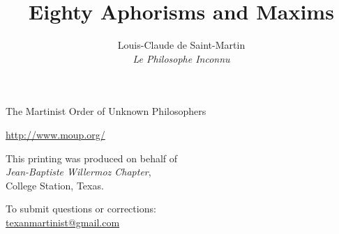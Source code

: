 \documentclass[openany,14pt]{article}
\title{Eighty Aphorisms and Maxims}
\author{Louis-Claude de Saint-Martin\\\emph{Le Philosophe Inconnu}}
\date{}
\begin{document}
	
	
	
	
	
	
	\blankpage

	\blankpage
	
	
	\vspace*{\fill}
	
	\begin{center}
		The Martinist Order of Unknown Philosophers\\\bigskip
		
		\url{http://www.moup.org/}
		
		\vspace*{\fill}
		
		This printing was produced on behalf of\\\textit{Jean-Baptiste Willermoz Chapter},\\College Station, Texas.
		
		\vspace*{\fill}
		
		To submit questions or corrections:\\
		\url{texanmartinist@gmail.com}
	\end{center}
	
	\vspace*{\fill}

	\restoregeometry
\end{document}
